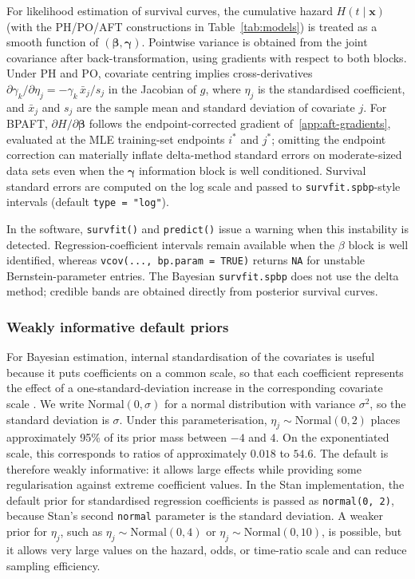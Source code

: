 \documentclass[5p,lefttitle]{elsarticle}
\begin{document}
{For likelihood estimation of survival curves, the cumulative hazard
\(H(t\mid\boldsymbol{x})\) (with the PH/PO/AFT constructions in
Table~\ref{tab:models}) is treated as a smooth function of
\((\boldsymbol{\beta},\boldsymbol{\gamma})\). Pointwise variance is obtained
from the joint covariance after back-transformation, using gradients with
respect to both blocks. Under PH and PO, covariate centring implies
cross-derivatives \(\partial \gamma_k / \partial \eta_j =
-\gamma_k\,\bar{x}_j/s_j\) in the Jacobian of \(g\), where \(\eta_j\) is the
standardised coefficient, and \(\bar{x}_j\) and
\(s_j\) are the sample mean and standard deviation of covariate \(j\).
For BPAFT, \(\partial H/\partial\boldsymbol{\beta}\) follows the endpoint-corrected
gradient of~\ref{app:aft-gradients}, evaluated at the MLE training-set
endpoints \(i^\ast\) and \(j^\ast\); omitting the endpoint correction can
materially inflate delta-method standard errors on moderate-sized data sets
even when the \(\boldsymbol{\gamma}\) information block is well conditioned.
Survival standard errors are computed on the log scale and passed to
\texttt{survfit.spbp}-style intervals (default \texttt{type = "log"}).

In the software, \texttt{survfit()} and \texttt{predict()} issue a
warning when this instability is detected. Regression-coefficient
intervals remain available when the \(\beta\) block is well identified,
whereas \texttt{vcov(..., bp.param = TRUE)} returns \texttt{NA} for
unstable Bernstein-parameter entries. The Bayesian \texttt{survfit.spbp}
does not use the delta method; credible bands are obtained directly
from posterior survival curves.

\subsubsection{Weakly informative default priors}\label{sec:priors}

For Bayesian estimation, internal standardisation of the covariates is
useful because it puts coefficients on a common scale, so that each
coefficient represents the effect of a one-standard-deviation increase
in the corresponding covariate scale \citep{gelman2008weakly}. We write
\(\mathrm{Normal}(0,\sigma)\) for a normal distribution with variance
\(\sigma^2\), so the standard deviation is \(\sigma\). Under this
parameterisation, \(\eta_j \sim \mathrm{Normal}(0,2)\) places
approximately 95\% of its prior mass between \(-4\) and \(4\). On the
exponentiated scale, this corresponds to ratios of approximately \(0.018\)
to \(54.6\). The default is therefore weakly informative: it allows large
effects while providing some regularisation against extreme coefficient
values. In the
Stan implementation, the default prior for standardised regression
coefficients is passed as \texttt{normal(0, 2)}, because Stan's second
\texttt{normal} parameter is the standard deviation.
A weaker prior for \(\eta_j\), such as \(\eta_j \sim \mathrm{Normal}(0,4)\)
or \(\eta_j \sim \mathrm{Normal}(0,10)\), is possible, but it allows
very large values on the hazard, odds, or time-ratio scale and can
reduce sampling efficiency.

}
\end{document}
